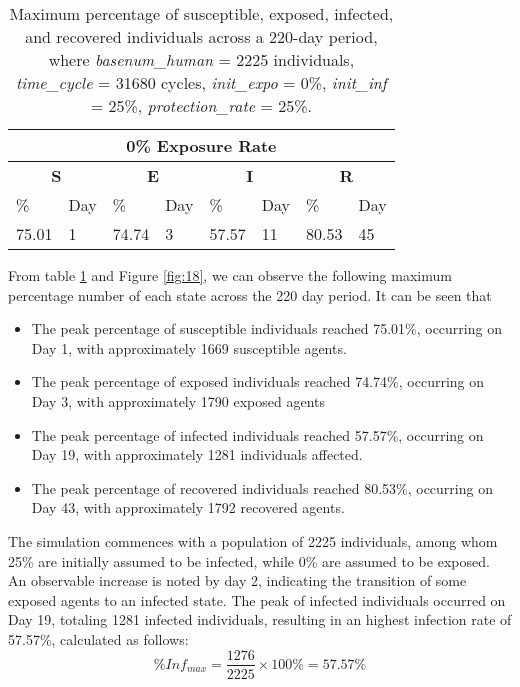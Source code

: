 \begin{table} [H]
	\centering
	\begin{tabular}{|l|l|l|l|l|l|l|l|}
		\hline
		\multicolumn{8}{|c|}{\textbf{0\% Exposure Rate}}\\
		\hline
		\multicolumn{2}{|c|}{\textbf{S}} &  \multicolumn{2}{c|}{\textbf{E}}&  \multicolumn{2}{c|}{\textbf{I}}&  \multicolumn{2}{c|}{\textbf{R}}\\
		\hline
		\%& Day & \% & Day & \%  & Day & \% & Day \\
		\hline
		75.01& 1 &74.74& 3 &  57.57& 11& 80.53&45\\
		\hline
	\end{tabular}
	\caption{Maximum percentage of susceptible, exposed, infected, and recovered individuals across a 220-day period, where \textit{basenum\_human} = 2225 individuals, \textit{time\_cycle} = 31680 cycles, \textit{init\_expo} = 0\%, \textit{init\_inf} = 25\%,  \textit{protection\_rate} = 25\%.}
	\label{ER1_Max}
\end{table}


From table \ref{ER1_Max} and Figure \ref{fig:18}, we can observe the following maximum percentage number of each state across the 220 day period. It can be seen that 

\begin{itemize}
	\item The peak percentage of susceptible individuals reached 75.01\%, occurring on Day 1, with approximately 1669 susceptible agents.
	\item The peak percentage of exposed individuals reached 74.74\%, occurring on Day 3, with approximately 1790 exposed agents
	\item The peak percentage of infected individuals reached 57.57\%, occurring on Day 19, with approximately 1281 individuals affected.
	\item The peak percentage of recovered individuals reached 80.53\%, occurring on Day 43, with approximately 1792 recovered agents. 
	
\end{itemize}
The simulation commences with a population of 2225 individuals, among whom 25\% are initially assumed to be infected, while 0\% are assumed to be exposed. An observable increase is noted by day 2, indicating the transition of some exposed agents to an infected state. The peak of infected individuals occurred on Day 19, totaling 1281 infected individuals, resulting in an highest infection rate of 57.57\%, calculated as follows:
\[ \%Inf_{max}= \frac{1276}{2225}\times 100\%  = 57.57\% \]

